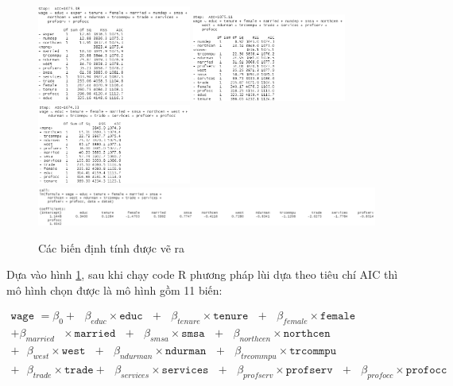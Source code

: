 \begin{figure}[H]
	\includegraphics[width=0.45\textwidth]{../Photo Of Result/stepAIC(4)-6}
	\includegraphics[width=0.45\textwidth]{../Photo Of Result/stepAIC(4)-7}
	\includegraphics[width=0.45\textwidth]{../Photo Of Result/stepAIC(4)-8}
	\includegraphics[width=\textwidth]{../Photo Of Result/stepAIC(4)-9}
	\caption{Các biến định tính được vẽ ra}
	\label{stepAIC}
\end{figure}

Dựa vào hình \ref{stepAIC}, sau khi chạy code R phương pháp lùi dựa theo tiêu chí AIC thì mô hình chọn được là mô hình gồm 11 biến:

\begin{equation*}
	\begin{multlined}
		\texttt{wage } = \beta_0 + \text{ } \beta_{educ}\times \texttt{educ} \text{ } + \text{ } \beta_{tenure} \times \texttt{tenure} \text{ }+\text{ }\beta_{female} \times \texttt{female} \text{ } \\
		+ \beta_{married} \text{ } \times \texttt{married} \text{ } +\text{ }\beta_{smsa} \times\texttt{smsa}\text{ } +\text{ }\beta_{northcen}\times \texttt{northcen} \\
		+\text{ }\beta_{west} \times \texttt{west} \text{ } + \text{ }\beta_{ndurman}\times \texttt{ndurman}\text{ } +\text{ }\beta_{trcommpu} \times\texttt{trcommpu}\text{ } \\
		+\text{ }\beta_{trade}\times \texttt{trade} +\text{ }\beta_{services} \times \texttt{services} \text{ } 
		+ \text{ }\beta_{profserv} \times \texttt{profserv} \text{ } + \text{ }\beta_{profocc}\times \texttt{profocc}
	\end{multlined}
\end{equation*}

